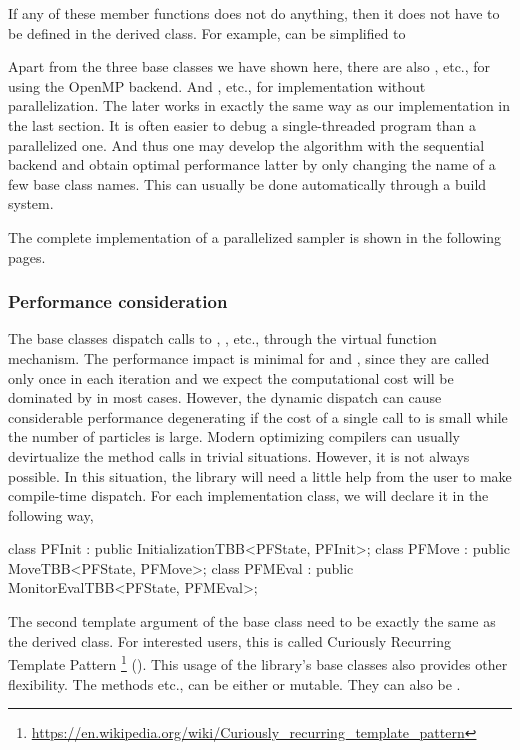 If any of these member functions does not do anything, then it does not have to
be defined in the derived class. For example,  can be
simplified to

Apart from the three base classes we have shown here, there are also
, etc., for using the OpenMP backend. And
, etc., for implementation without
parallelization. The later works in exactly the same way as our implementation
in the last section. It is often easier to debug a single-threaded program than
a parallelized one. And thus one may develop the algorithm with the sequential
backend and obtain optimal performance latter by only changing the name of a
few base class names. This can usually be done automatically through a build
system.

The complete implementation of a parallelized sampler is shown in the following
pages.

\subsubsection{Performance consideration}
\label{sub:Performance consideration}

The base classes dispatch calls to , ,
etc., through the virtual function mechanism. The performance impact is minimal
for  and , since they are called only
once in each iteration and we expect the computational cost will be dominated
by  in most cases. However, the dynamic dispatch can cause
considerable performance degenerating if the cost of a single call to
 is small while the number of particles is large. Modern
optimizing compilers can usually devirtualize the method calls in trivial
situations. However, it is not always possible. In this situation, the library
will need a little help from the user to make compile-time dispatch. For each
implementation class, we will declare it in the following way,
\begin{cppcode}
  class PFInit : public InitializationTBB<PFState, PFInit>;
  class PFMove : public MoveTBB<PFState, PFMove>;
  class PFMEval : public MonitorEvalTBB<PFState, PFMEval>;
\end{cppcode}
The second template argument of the base class need to be exactly the same as
the derived class. For interested users, this is called Curiously Recurring
Template Pattern%
\footnote{\url{https://en.wikipedia.org/wiki/Curiously_recurring_template_pattern}}
(\crtp). This usage of the library's base classes also provides other
flexibility. The methods  etc., can be either
 or mutable. They can also be .
